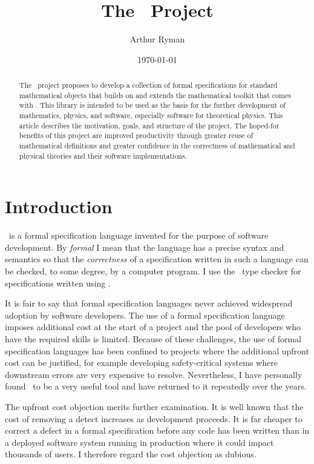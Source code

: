 \documentclass{amsart}
\begin{document}
\title{The \mathz\ Project}
\author{Arthur Ryman}
\date{\today}

\begin{abstract}
The \mathz\ project proposes to develop a collection of formal specifications for standard mathematical objects
that builds on and extends the mathematical toolkit that comes with \ZN.
This library is intended to be used as the basis for the further development of mathematics, physics, and software,
especially software for theoretical physics.
This article describes the motivation, goals, and structure of the project.
The hoped-for benefits of this project are improved productivity through greater reuse of mathematical definitions 
and greater confidence in the correctness of mathematical and physical theories and their software implementations.
\end{abstract}

\maketitle

\tableofcontents

\section{Introduction}

\ZN\ is a formal specification language invented for the purpose of software development.
By \emph{formal} I mean that the language has a precise syntax and semantics so that 
the  \emph{correctness} of a specification written in such a language can be checked, to some degree,
by a computer program.
I use the \fuzz\ type checker for specifications written using \ZN.

It is fair to say that formal specification languages never achieved widespread adoption by software developers.
The use of a formal specification language imposes additional cost at the start of a project and the pool of developers
who have the required skills is limited.
Because of these challenges, the use of formal specification languages has been confined to projects where the
additional upfront cost can be justified, for example developing safety-critical systems where downstream errors
are very expensive to resolve.
Nevertheless, I have personally found \ZN\ to be a very useful tool and have returned to it repeatedly over the years.

The upfront cost objection merits further examination.
It is well known that the cost of removing a detect increases as development proceeds.
It is far cheaper to correct a defect in a formal specification before any code has been written
than in a deployed software system running in production
where it could impact thousands of users.
I therefore regard the cost objection as dubious.
\end{document}
